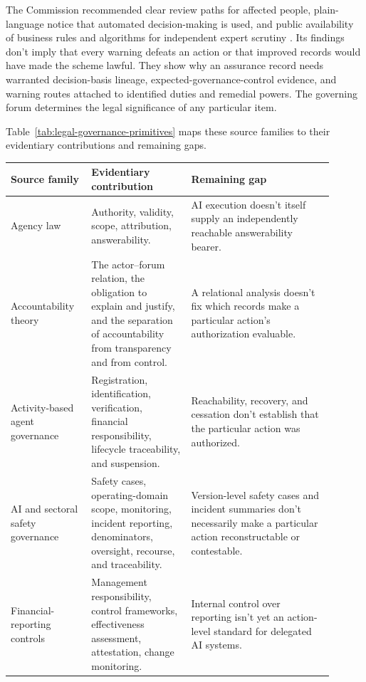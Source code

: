 The Commission recommended clear review paths for affected people, plain-language notice that automated decision-making is used, and public availability of business rules and algorithms for independent expert scrutiny \citep{robodebtRoyalCommission2023}. Its findings don't imply that every warning defeats an action or that improved records would have made the scheme lawful. They show why an assurance record needs warranted decision-basis lineage, expected-governance-control evidence, and warning routes attached to identified duties and remedial powers. The governing forum determines the legal significance of any particular item.

Table~\ref{tab:legal-governance-primitives} maps these source families to their evidentiary contributions and remaining gaps.

\begin{table}[tbp]
\small
\centering
\begin{tabular}{>{\raggedright\arraybackslash}p{0.22\linewidth}%
                >{\raggedright\arraybackslash}p{0.28\linewidth}%
                >{\raggedright\arraybackslash}p{0.40\linewidth}}
\toprule
Source family & Evidentiary contribution & Remaining gap \\
\midrule
Agency law & Authority, validity, scope, attribution, answerability. & AI execution doesn't itself supply an independently reachable answerability bearer. \\
Accountability theory & The actor--forum relation, the obligation to explain and justify, and the separation of accountability from transparency and from control. & A relational analysis doesn't fix which records make a particular action's authorization evaluable. \\
Activity-based agent governance & Registration, identification, verification, financial responsibility, lifecycle traceability, and suspension. & Reachability, recovery, and cessation don't establish that the particular action was authorized. \\
AI and sectoral safety governance & Safety cases, operating-domain scope, monitoring, incident reporting, denominators, oversight, recourse, and traceability. & Version-level safety cases and incident summaries don't necessarily make a particular action reconstructable or contestable. \\
Financial-reporting controls & Management responsibility, control frameworks, effectiveness assessment, attestation, change monitoring. & Internal control over reporting isn't yet an action-level standard for delegated AI systems. \\

\end{tabular}
\end{table}
